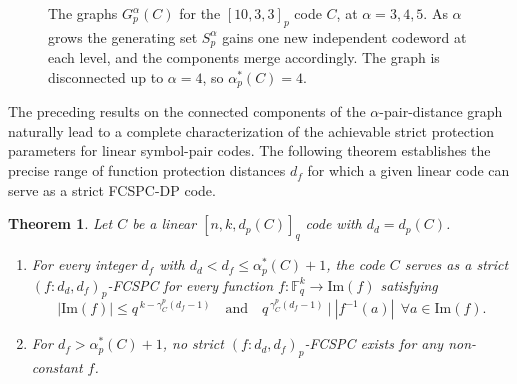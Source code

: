 \documentclass[11pt,draftclsnofoot,journal,onecolumn]{IEEEtran}
\newtheorem{theorem}{Theorem}
\begin{document}
\begin{figure}[t]
        \caption{The graphs $G_p^{\alpha}(C)$ for the $[10,3,3]_p$ code $C$, at $\alpha=3,4,5$. As $\alpha$ grows the generating set $S_p^{\alpha}$ gains one new independent codeword at each level, and the components merge accordingly. The graph is disconnected up to $\alpha=4$, so $\alpha_p^{*}(C)=4$.}
    \label{fig:levels-10-3}
    \end{figure}

     The preceding results on the connected components of the $\alpha$-pair-distance graph naturally lead to a complete characterization of the achievable strict protection parameters for linear symbol-pair codes. The following theorem establishes the precise range of function protection distances $d_f$ for which a given linear code can serve as a strict FCSPC-DP code.
    
    \begin{theorem}
    \label{thm:pair-tradeoff}
    Let $C$ be a linear $[n,k,d_p(C)]_q$ code with $d_d=d_p(C)$.
    \begin{enumerate}
    \item[(i)] For every integer $d_f$ with $d_d<d_f\le\alpha_p^{*}(C)+1$, the  code $C$ serves as a strict $(f:d_d,d_f)_p$-FCSPC for every function $f:\mathbb{F}_q^k\to\mathrm{Im}(f)$ satisfying
    \[
    |\mathrm{Im}(f)|\le q^{\,k-\gamma_C^p(d_f-1)} \quad\text{and}\quad q^{\,\gamma_C^p(d_f-1)}\ \big|\ |f^{-1}(a)|\ \ \forall a\in\mathrm{Im}(f).
    \]
    \item[(ii)] For $d_f>\alpha_p^{*}(C)+1$, no strict $(f:d_d,d_f)_p$-FCSPC exists for any non-constant $f$.
    \end{enumerate}
    \end{theorem}
\end{document}

